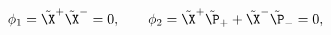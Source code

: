 \begin{equation}
\phi_1=\tilde\X^+\tilde\X^-=0,\qquad
\phi_2=\tilde\X^+\tilde\P_++\tilde\X^-\tilde\P_-=0,
\label{contil}
\end{equation}

